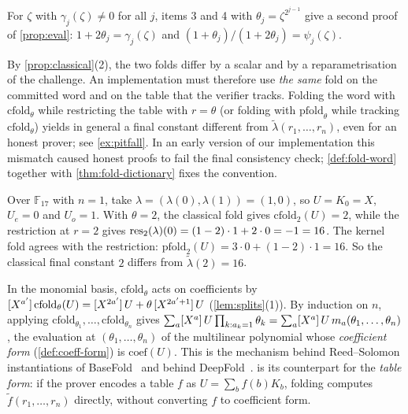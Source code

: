 For $\zeta$ with $\gamma_j(\zeta) \ne 0$ for all $j$, items 3 and 4 with $\theta_j = \zeta^{2^{j-1}}$ give a second proof of \cref{prop:eval}: $1 + 2\theta_j = \gamma_j(\zeta)$ and $(1+\theta_j)/(1+2\theta_j) = \psi_j(\zeta)$.

\begin{remark}\label{rem:pitfall}
By \cref{prop:classical}(2), the two folds differ by a scalar and by a reparametrisation of the challenge.
An implementation must therefore use \emph{the same} fold on the committed word and on the table that the verifier tracks.
Folding the word with $\mathrm{cfold}_\theta$ while restricting the table with $r = \theta$ (or folding with $\mathrm{pfold}_\theta$ while tracking $\mathrm{cfold}_\theta$) yields in general a final constant different from $\tilde\lambda(r_1,\dots,r_n)$, even for an honest prover; see \cref{ex:pitfall}.
In an early version of our implementation this mismatch caused honest proofs to fail the final consistency check; \cref{def:fold-word} together with \cref{thm:fold-dictionary} fixes the convention.
\end{remark}

\begin{example}\label{ex:pitfall}
Over $\mathbb{F}_{17}$ with $n = 1$, take $\lambda = (\lambda(0), \lambda(1)) = (1, 0)$, so $U = K_0 = X$, $U_e = 0$ and $U_o = 1$.
With $\theta = 2$, the classical fold gives $\mathrm{cfold}_2(U) = 2$, while the restriction at $r = 2$ gives $\mathrm{res}_2(\lambda)(0) = (1-2)\cdot 1 + 2 \cdot 0 = -1 = 16$.
The kernel fold agrees with the restriction: $\mathrm{pfold}_2(U) = 3 \cdot 0 + (1-2)\cdot 1 = 16$. So the classical final constant $2$ differs from $\tilde\lambda(2) = 16$.
\end{example}

\begin{remark}\label{rem:coeff-form}
In the monomial basis, $\mathrm{cfold}_\theta$ acts on coefficients by $[X^{a'}]\,\mathrm{cfold}_\theta(U) = [X^{2a'}]\,U + \theta\,[X^{2a'+1}]\,U$ (\cref{lem:splits}(1)).
By induction on $n$, applying $\mathrm{cfold}_{\theta_1},\dots,\mathrm{cfold}_{\theta_n}$ gives $\sum_a [X^{a}]\,U \prod_{k : a_k = 1} \theta_k = \sum_a [X^{a}]\,U\, m_a(\theta_1,\dots,\theta_n)$, the evaluation at $(\theta_1,\dots,\theta_n)$ of the multilinear polynomial whose \emph{coefficient form} (\cref{def:coeff-form}) is $\mathrm{coef}(U)$.
This is the mechanism behind Reed--Solomon instantiations of BaseFold~\cite{ZCF24} and behind DeepFold~\cite{GLHQTZ25}.
 is its counterpart for the \emph{table form}: if the prover encodes a table $f$ as $U = \sum_b f(b) K_b$, folding computes $\tilde f(r_1,\dots,r_n)$ directly, without converting $f$ to coefficient form.
\end{remark}
